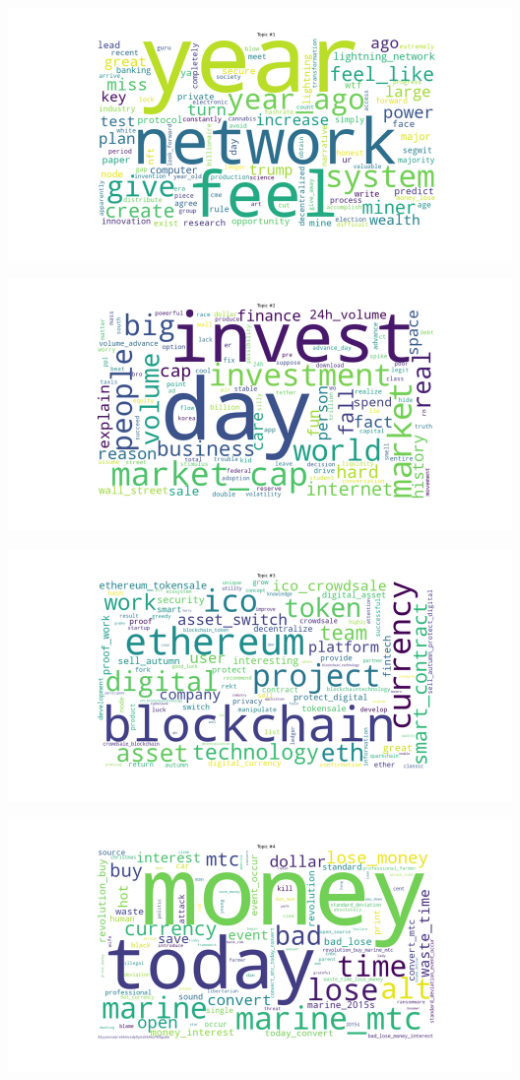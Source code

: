 \documentclass[
]{article}
\begin{document}
\pagebreak

\includegraphics{images/03 - Topic_1.png}

\pagebreak

\includegraphics{images/03 - Topic_2.png}

\pagebreak

\includegraphics{images/03 - Topic_3.png}

\pagebreak

\includegraphics{images/03 - Topic_4.png}
\end{document}
